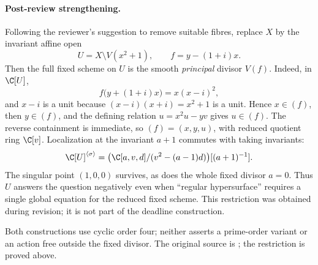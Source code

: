 \paragraph{Post-review strengthening.}
Following the reviewer's suggestion to remove suitable fibres, replace
\(X\) by the invariant affine open
\[
 U=X\setminus V(x^2+1),\qquad f=y-(1+i)x.
\]
Then the full fixed scheme on \(U\) is the smooth \emph{principal}
divisor \(V(f)\). Indeed, in \(\C[U]\),
\[
 f\bigl(y+(1+i)x\bigr)=x(x-i)^2,
\]
and \(x-i\) is a unit because \((x-i)(x+i)=x^2+1\) is a unit.
Hence \(x\in(f)\), then \(y\in(f)\), and the defining relation
\(u=x^2u-yv\) gives \(u\in(f)\). The reverse containment is immediate,
so \((f)=(x,y,u)\), with reduced quotient ring \(\C[v]\).
Localization at the invariant \(a+1\) commutes with taking invariants:
\[
 \C[U]^{\langle\sigma\rangle}
 =\bigl(\C[a,v,d]/(v^2-(a-1)d)\bigr)[(a+1)^{-1}].
\]
The singular point \((1,0,0)\) survives, as does the whole fixed
divisor \(a=0\). Thus \(U\) answers the question negatively even
when ``regular hypersurface'' requires a single global equation for
the reduced fixed scheme. This restriction was obtained during revision;
it is not part of the deadline construction.

Both constructions use cyclic order four; neither asserts a prime-order
variant or an action free outside the fixed divisor. The original source
is ; the restriction is proved above.

